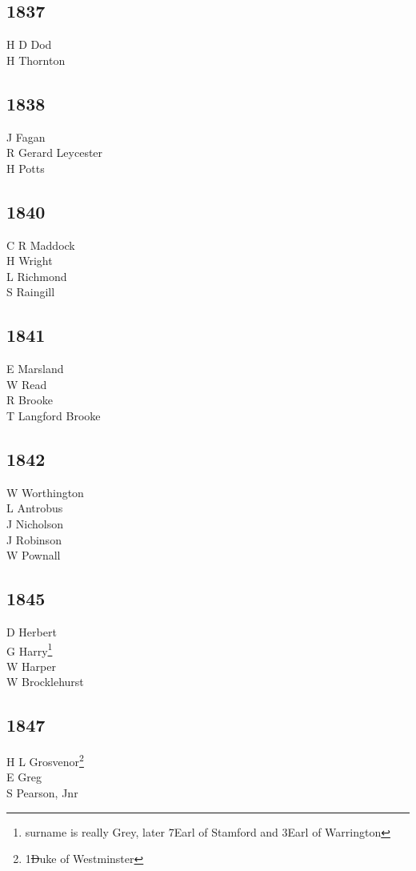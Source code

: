 \begin{multicols}{3}
  \subsection*{1837}
  H D Dod \\
  H Thornton \\
  \subsection*{1838}
  J Fagan \\
  R Gerard Leycester \\
  H Potts \\
  \subsection*{1840}
  C R Maddock \\
  H Wright \\
  L Richmond \\
  S Raingill \\
  \subsection*{1841}
  E Marsland \\
  W Read \\
  R Brooke \\
  T Langford Brooke \\
  \subsection*{1842}
  W Worthington \\
  L Antrobus \\
  J Nicholson \\
  J Robinson \\
  W Pownall \\
  \subsection*{1845}
  D Herbert \\
  G Harry\footnote{surname is really Grey, later 7\nth Earl of Stamford and 3\rd Earl of Warrington} \\
  W Harper \\
  W Brocklehurst \\
  \subsection*{1847}
  H L Grosvenor\footnote{1\st Duke of Westminster} \\
  E Greg \\
  S Pearson, Jnr \\

\end{multicols}
